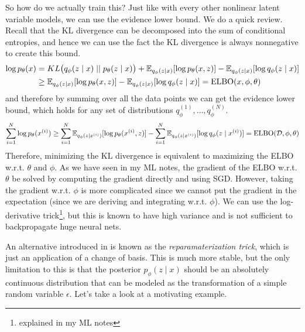   So how do we actually train this? Just like with every other nonlinear latent variable models, we can use the evidence lower bound. We do a quick review. Recall that the KL divergence can be decomposed into the sum of conditional entropies, and hence we can use the fact the KL divergence is always nonnegative to create this bound. 
  \begin{align}
    \log p_\theta (x) & = KL \big( q_\phi (z \mid x) \mid\mid p_{\theta} (z \mid x) \big) + \mathbb{E}_{q_{\phi} (z \mid x)} [\log p_{\theta} (x, z)] - \mathbb{E}_{q_\phi(z \mid x)} [ \log q_{\phi} (z \mid x)] \\
                      & \geq \mathbb{E}_{q_{\phi} (z \mid x)} [\log p_{\theta} (x, z)] - \mathbb{E}_{q_\phi(z \mid x)} [ \log q_{\phi} (z \mid x)] = \elbo(x, \phi, \theta)
  \end{align}
  and therefore by summing over all the data points we can get the evidence lower bound, which holds for any set of distributions $q_\phi^{(1)}, \ldots, q_\phi^{(N)}$.  
  \begin{equation}
    \sum_{i=1}^N \log p_{\theta} (x^{(i)}) \geq \sum_{i=1}^N \mathbb{E}_{q_\phi (z \mid x^{(i)})} [ \log p_{\theta} (x^{(i)}, z)] - \sum_{i=1}^N \mathbb{E}_{q_{\phi} (z \mid x^{(i)})} [ \log q_{\phi} (z \mid x^{(i)}) ] = \elbo(\mathcal{D}, \phi, \theta)
  \end{equation}
  Therefore, minimizing the KL divergence is equivalent to maximizing the ELBO w.r.t. $\theta$ and $\phi$. As we have seen in my ML notes, the gradient of the ELBO w.r.t. $\theta$ be solved by computing the gradient directly and using SGD. However, taking the gradient w.r.t. $\phi$ is more complicated since we cannot put the gradient in the expectation (since we are deriving and integrating w.r.t. $\phi$). We can use the log-derivative trick\footnote{explained in my ML notes}, but this is known to have high variance and is not sufficient to backpropagate huge neural nets. 

  An alternative introduced in \cite{vae} is known as the \textit{reparamaterization trick}, which is just an application of a change of basis. This is much more stable, but the only limitation to this is that the posterior $p_\phi (z \mid x)$ should be an absolutely continuous distribution that can be modeled as the transformation of a simple random variable $\epsilon$. Let's take a look at a motivating example. 
  
